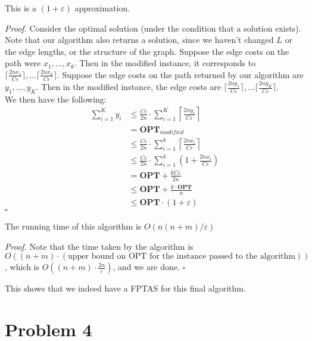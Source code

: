 \documentclass[a4paper]{article}
\newenvironment{proof}{\begin{breakbox}\textit{Proof.}}{\hfill$\square$\end{breakbox}}
\newcommand{\nl}{\vspace{0.2cm}\\}
\newcommand{\eps}{\varepsilon}
\newcommand{\OPT}{\mathbf{OPT}}
\begin{document}
\begin{claim}
    This is a $(1 + \eps)$ approximation.
\end{claim}
\begin{proof}
    Consider the optimal solution (under the condition that a solution exists). Note that our algorithm also returns a solution, since we haven't changed $L$ or the edge lengths, or the
    structure of the graph. Suppose the edge costs on the path were $x_1, \ldots, x_k$. Then in the modified instance, it corresponds to $\lceil\frac{2nx_1}{C\eps}\rceil,\ldots
    \lceil\frac{2nx_k}{C\eps}\rceil$. Suppose the edge costs on the path returned by our algorithm are $y_1, \ldots, y_K$. Then in the modified instance, the edge costs are $\lceil\frac{2ny_1}{C\eps}\rceil,\ldots
    \lceil\frac{2ny_K}{C\eps}\rceil$.\nl
    We then have the following:
    \begin{align*}
        \sum_{i = 1}^K y_i &\le \frac{C\eps}{2n} \cdot \sum_{i = 1}^K \left\lceil \frac{2n y_i}{C\eps} \right\rceil\\
                &= \OPT_{modified}\\
                &\le \frac{C\eps}{2n} \cdot \sum_{i = 1}^k \left\lceil \frac{2n x_i}{C\eps} \right\rceil\\
                &\le \frac{C\eps}{2n} \cdot \sum_{i = 1}^k \left(1 + \frac{2n x_i}{C \eps}\right)\\
                &= \OPT + \frac{kC\eps}{2n}\\
                &\le \OPT + \frac{k \cdot \OPT}{n}\\
                &\le \OPT \cdot (1 + \eps)
    \end{align*}
\end{proof}

\begin{claim}
    The running time of this algorithm is $O(n(n + m) / \eps)$
\end{claim}
\begin{proof}
    Note that the time taken by the algorithm is $O((n + m) \cdot (\text{upper bound on OPT for the instance passed to the algorithm}))$, which is $O((n + m) \cdot \frac{2n}{\eps})$, and
    we are done.
\end{proof}

This shows that we indeed have a FPTAS for this final algorithm.

\newpage

\section{Problem 4}
\end{document}
